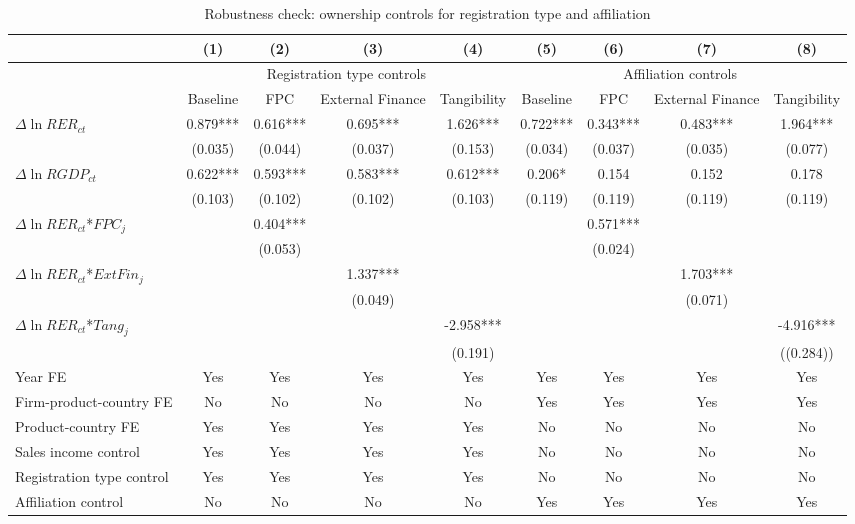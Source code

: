 \documentclass[12pt]{article}
\begin{document}
\begin{table}
	\centering
	\caption{Robustness check: ownership controls for registration type and affiliation}
	\begin{threeparttable}
		\begin{tabular}{lcccccccc}
			\toprule
			& (1)   & (2)   & (3)   & (4) &  (5)  &  (6)  & (7)  & (8)\\
			\midrule
			& \multicolumn{4}{c}{Registration type controls} & \multicolumn{4}{c}{Affiliation controls}\\
			& Baseline & FPC   & External Finance & Tangibility & Baseline & FPC & External Finance & Tangibility\\
			\midrule
			$\Delta \ln RER_{ct}$ & 0.879*** & 0.616*** & 0.695*** & 1.626*** & 0.722*** & 0.343*** & 0.483*** & 1.964*** \\
			& (0.035) & (0.044) & (0.037) & (0.153) & (0.034) & (0.037) & (0.035) & (0.077) \\
			$\Delta \ln RGDP_{ct}$ & 0.622*** & 0.593*** & 0.583*** & 0.612*** & 0.206* & 0.154 & 0.152 & 0.178 \\
			& (0.103) & (0.102) & (0.102) & (0.103) & (0.119) & (0.119) & (0.119) & (0.119) \\
			$\Delta \ln RER_{ct}$*$FPC_{j}$ &       & 0.404*** &       &  &  & 0.571*** &&\\
			&       & (0.053) &       &  &  & (0.024) &&\\
			$\Delta \ln RER_{ct}$*$ExtFin_{j}$ &       &       & 1.337*** &  &&&1.703***&\\
			&       &       & (0.049) &  &&&(0.071)&\\
			$\Delta \ln RER_{ct}$*$Tang_{j}$ &       &       &       & -2.958*** &&&&-4.916***\\
			&       &       &       & (0.191) &&&&((0.284))\\
			Year FE  &  Yes   & Yes   & Yes   & Yes & Yes   & Yes   & Yes   & Yes\\
			Firm-product-country FE  & No & No & No & No &  Yes   & Yes   & Yes   & Yes\\
			Product-country FE &  Yes   & Yes   & Yes   & Yes & No & No & No & No\\
			Sales income control &  Yes   & Yes   & Yes   & Yes & No & No & No & No\\
			Registration type control &  Yes   & Yes & Yes  & Yes & No & No & No & No\\
			Affiliation control & No & No & No & No &  Yes  & Yes & Yes  & Yes \\

\end{tabular}
\end{threeparttable}
\end{table}
\end{document}
